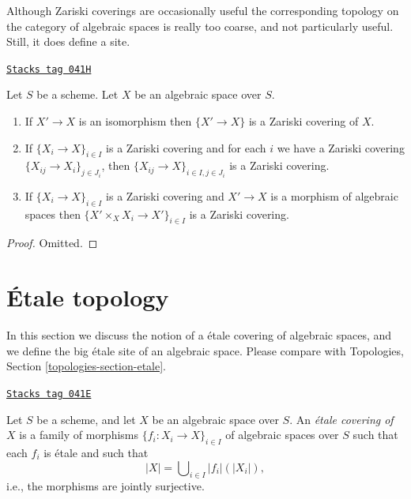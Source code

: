 Although Zariski coverings are occasionally useful the corresponding topology
on the category of algebraic spaces is really too coarse, and not particularly
useful. Still, it does define a site.

\begin{lemma}[Zariski]
\label{spaces-topologies-lemma-zariski}
\href{https://stacks.math.columbia.edu/tag/041H}{\texttt{Stacks tag 041H}}

Let $S$ be a scheme.
Let $X$ be an algebraic space over $S$.
\begin{enumerate}
\item If $X' \to X$ is an isomorphism then $\{X' \to X\}$
is a Zariski covering of $X$.
\item If $\{X_i \to X\}_{i\in I}$ is a Zariski covering and for each
$i$ we have a Zariski covering $\{X_{ij} \to X_i\}_{j\in J_i}$, then
$\{X_{ij} \to X\}_{i \in I, j\in J_i}$ is a Zariski covering.
\item If $\{X_i \to X\}_{i\in I}$ is a Zariski covering
and $X' \to X$ is a morphism of algebraic spaces then
$\{X' \times_X X_i \to X'\}_{i\in I}$ is a Zariski covering.
\end{enumerate}
\end{lemma}

\begin{proof}
Omitted.
\end{proof}

\section{\'Etale topology}
\label{spaces-topologies-section-etale}
In this section we discuss the notion of a \'etale covering of
algebraic spaces, and we define the big \'etale site of an
algebraic space. Please compare with
Topologies, Section \ref{topologies-section-etale}.

\begin{definition}
\label{spaces-topologies-definition-etale-covering}
\href{https://stacks.math.columbia.edu/tag/041E}{\texttt{Stacks tag 041E}}

Let $S$ be a scheme, and let $X$ be an algebraic space over $S$.
An {\it \'etale covering of $X$} is a family of morphisms
$\{f_i : X_i \to X\}_{i \in I}$ of algebraic spaces over $S$
such that each $f_i$ is \'etale
and such that
$$
|X| = \bigcup\nolimits_{i \in I} |f_i|(|X_i|),
$$
i.e., the morphisms are jointly surjective.
\end{definition}

